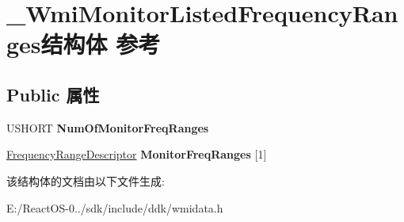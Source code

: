 \hypertarget{struct___wmi_monitor_listed_frequency_ranges}{}\section{\+\_\+\+Wmi\+Monitor\+Listed\+Frequency\+Ranges结构体 参考}
\label{struct___wmi_monitor_listed_frequency_ranges}
\subsection*{Public 属性}
\begin{DoxyCompactItemize}
\item 
\mbox{\label{struct___wmi_monitor_listed_frequency_ranges_afd48604e8f9eb27e4892ffc2d15ea313}} 
U\+S\+H\+O\+RT {\bfseries Num\+Of\+Monitor\+Freq\+Ranges}
\item 
\mbox{\label{struct___wmi_monitor_listed_frequency_ranges_a5acc2c99c8fe2ba0954d652ebf73f60b}} 
\hyperlink{struct___frequency_range_descriptor}{Frequency\+Range\+Descriptor} {\bfseries Monitor\+Freq\+Ranges} \mbox{[}1\mbox{]}
\end{DoxyCompactItemize}


该结构体的文档由以下文件生成\+:\begin{DoxyCompactItemize}
\item 
E\+:/\+React\+O\+S-\/0../sdk/include/ddk/wmidata.\+h\end{DoxyCompactItemize}

